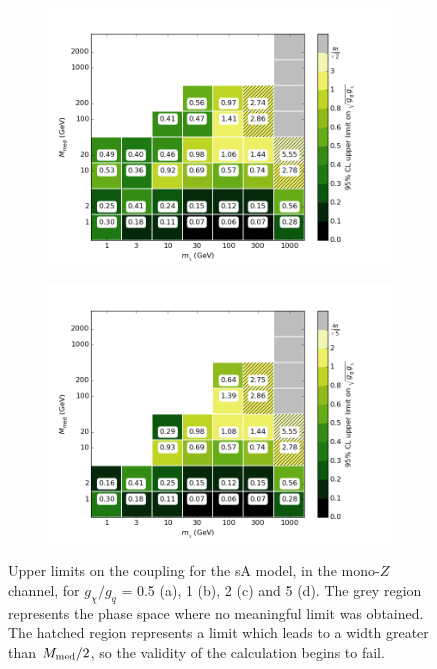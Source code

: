 \begin{figure}[h]
\begin{subfigure}[t]{0.45\textwidth}
      \includegraphics[width=1.\textwidth]{figures/grid_allpoints_SAD_rat2.png}
      \caption{}
    \end{subfigure}
    \begin{subfigure}[t]{0.45\textwidth}
      \centering
      \includegraphics[width=1.\textwidth]{figures/grid_allpoints_SAD_rat5.png}
      \caption{}
    \end{subfigure}
    \caption{Upper limits on the coupling for the sA model, in the mono-$Z$ channel, for $g_{\chi} / g_q$ = 0.5 (a), 1 (b), 2 (c) and 5 (d). The grey region represents the phase space where no meaningful limit was obtained. The hatched region represents a limit which leads to a width greater than $M_{\mathrm{med}} / 2$, so the validity of the calculation begins to fail.}
    \label{fig:MonoZ_SAD_couplinglimit}
\end{figure}

